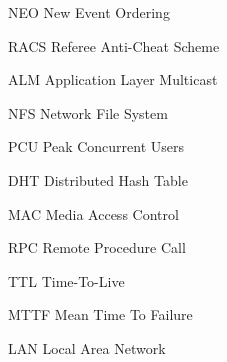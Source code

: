 \begin{Nomencl}[\gnat]
        \item[NEO]      New Event Ordering
        \item[RACS]     Referee Anti-Cheat Scheme
        \item[ALM]      Application Layer Multicast
        \item[NFS]      Network File System
        \item[PCU]      Peak Concurrent Users
        \item[DHT]      Distributed Hash Table
        \item[MAC]      Media Access Control
        \item[RPC]      Remote Procedure Call
        \item[TTL]      Time-To-Live
        \item[MTTF]     Mean Time To Failure
        \item[LAN]      Local Area Network
\end{Nomencl}
\endinput

